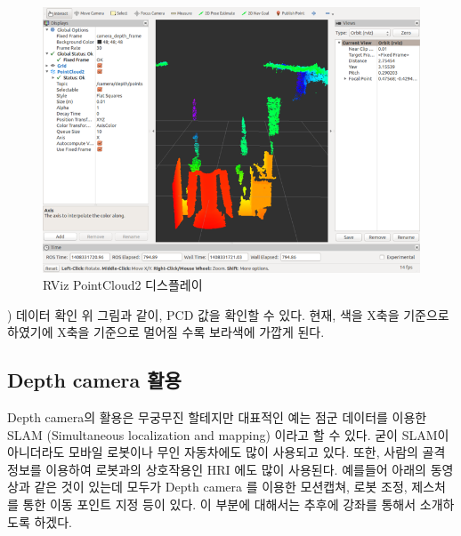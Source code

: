 \begin{figure}[h]
\centering\includegraphics[width=\columnwidth]{pictures/chapter9/rviz_pc2.png}
\caption{RViz PointCloud2 디스플레이}
\end{figure}

\vspace{\baselineskip}
\noindent
{}
\thenum) 데이터 확인
\noindent
위 그림과 같이, PCD 값을 확인할 수 있다. 현재, 색을 X축을 기준으로 하였기에 X축을 기준으로 멀어질 수록 보라색에 가깝게 된다.

\subsection{Depth camera 활용}

Depth camera의 활용은 무궁무진 할테지만 대표적인 예는 점군 데이터를 이용한 SLAM (Simultaneous localization and mapping) 이라고 할 수 있다. 굳이 SLAM이 아니더라도 모바일 로봇이나 무인 자동차에도 많이 사용되고 있다. 또한, 사람의 골격 정보를 이용하여 로봇과의 상호작용인 HRI 에도 많이 사용된다. 예를들어 아래의 동영상과 같은 것이 있는데 모두가 Depth camera 를 이용한 모션캡쳐, 로봇 조정, 제스처를 통한 이동 포인트 지정 등이 있다. 이 부분에 대해서는 추후에 강좌를 통해서 소개하도록 하겠다.






